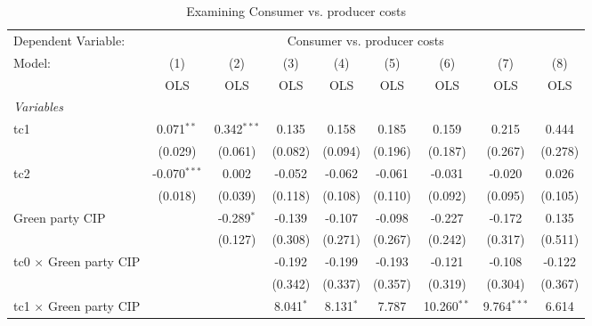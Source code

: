 
\begin{table}[htbp]
   \caption{Examining Consumer vs. producer costs}
   \centering
   \begin{tabular}{lcccccccc}
      \toprule
      Dependent Variable: & \multicolumn{8}{c}{Consumer vs. producer costs}\\
      Model:                                  & (1)            & (2)           & (3)         & (4)         & (5)     & (6)           & (7)           & (8)\\  
                                              &  OLS           & OLS           & OLS         & OLS         & OLS     & OLS           & OLS           & OLS\\  
      \midrule
      \emph{Variables}\\
      tc1                                     & 0.071$^{**}$   & 0.342$^{***}$ & 0.135       & 0.158       & 0.185   & 0.159         & 0.215         & 0.444\\   
                                              & (0.029)        & (0.061)       & (0.082)     & (0.094)     & (0.196) & (0.187)       & (0.267)       & (0.278)\\   
      tc2                                     & -0.070$^{***}$ & 0.002         & -0.052      & -0.062      & -0.061  & -0.031        & -0.020        & 0.026\\   
                                              & (0.018)        & (0.039)       & (0.118)     & (0.108)     & (0.110) & (0.092)       & (0.095)       & (0.105)\\   
      Green party CIP                         &                & -0.289$^{*}$  & -0.139      & -0.107      & -0.098  & -0.227        & -0.172        & 0.135\\   
                                              &                & (0.127)       & (0.308)     & (0.271)     & (0.267) & (0.242)       & (0.317)       & (0.511)\\   
      tc0 $\times$ Green party CIP            &                &               & -0.192      & -0.199      & -0.193  & -0.121        & -0.108        & -0.122\\   
                                              &                &               & (0.342)     & (0.337)     & (0.357) & (0.319)       & (0.304)       & (0.367)\\   
      tc1 $\times$ Green party CIP            &                &               & 8.041$^{*}$ & 8.131$^{*}$ & 7.787   & 10.260$^{**}$ & 9.764$^{***}$ & 6.614\\   

\end{tabular}
\end{table}

